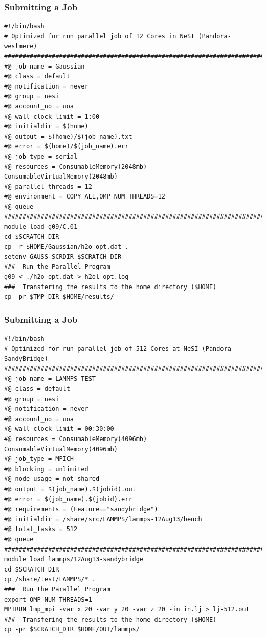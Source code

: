 \documentclass{beamer}
\begin{document}
\begin{frame}
  \frametitle{Submitting a Job}
\begin{verbatim}
#!/bin/bash 
# Optimized for run parallel job of 12 Cores in NeSI (Pandora-westmere)
##########################################################################
#@ job_name = Gaussian
#@ class = default
#@ notification = never
#@ group = nesi
#@ account_no = uoa
#@ wall_clock_limit = 1:00
#@ initialdir = $(home)
#@ output = $(home)/$(job_name).txt
#@ error = $(home)/$(job_name).err
#@ job_type = serial
#@ resources = ConsumableMemory(2048mb) ConsumableVirtualMemory(2048mb)
#@ parallel_threads = 12
#@ environment = COPY_ALL,OMP_NUM_THREADS=12
#@ queue
########################################################################## 
module load g09/C.01
cd $SCRATCH_DIR
cp -r $HOME/Gaussian/h2o_opt.dat . 
setenv GAUSS_SCRDIR $SCRATCH_DIR
###  Run the Parallel Program
g09 < ./h2o_opt.dat > h2ol_opt.log
###  Transfering the results to the home directory ($HOME) 
cp -pr $TMP_DIR $HOME/results/
\end{verbatim}
\end{frame}

\begin{frame}
  \frametitle{Submitting a Job}
\begin{verbatim}
#!/bin/bash
# Optimized for run parallel job of 512 Cores at NeSI (Pandora-SandyBridge)
##########################################################################
#@ job_name = LAMMPS_TEST
#@ class = default
#@ group = nesi
#@ notification = never
#@ account_no = uoa
#@ wall_clock_limit = 00:30:00
#@ resources = ConsumableMemory(4096mb) ConsumableVirtualMemory(4096mb)
#@ job_type = MPICH
#@ blocking = unlimited
#@ node_usage = not_shared
#@ output = $(job_name).$(jobid).out
#@ error = $(job_name).$(jobid).err
#@ requirements = (Feature=="sandybridge")
#@ initialdir = /share/src/LAMMPS/lammps-12Aug13/bench
#@ total_tasks = 512
#@ queue
##########################################################################
module load lammps/12Aug13-sandybridge
cd $SCRATCH_DIR
cp /share/test/LAMMPS/* .
###  Run the Parallel Program
export OMP_NUM_THREADS=1
MPIRUN lmp_mpi -var x 20 -var y 20 -var z 20 -in in.lj > lj-512.out
###  Transfering the results to the home directory ($HOME)
cp -pr $SCRATCH_DIR $HOME/OUT/lammps/
\end{verbatim}
\end{frame}
\end{document}
